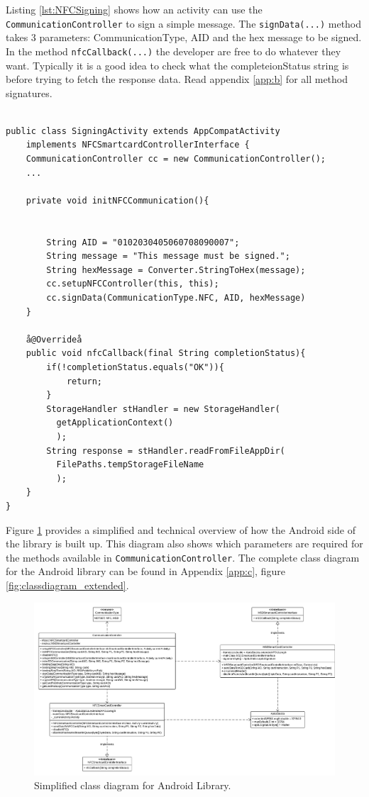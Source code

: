 Listing \ref{lst:NFCSigning} shows how an activity can use the \texttt{CommunicationController} to sign a simple message. The \texttt{signData(...)} method takes 3 parameters: CommunicationType, AID and the hex message to be signed. In the method \texttt{nfcCallback(...)} the developer are free to do whatever they want. Typically it is a good idea to check what the completeionStatus string is before trying to fetch the response data. Read appendix \ref{app:b} for all method signatures.

\begin{lstlisting}[caption=Java code example showing how to send sign a message using a NFC smart card., label=lst:NFCSigning,escapechar=å]

public class SigningActivity extends AppCompatActivity
    implements NFCSmartcardControllerInterface {
    CommunicationController cc = new CommunicationController();
    ...

    private void initNFCCommunication(){


        String AID = "0102030405060708090007";
        String message = "This message must be signed.";
        String hexMessage = Converter.StringToHex(message);
        cc.setupNFCController(this, this);
        cc.signData(CommunicationType.NFC, AID, hexMessage)
    }

    å@Overrideå
    public void nfcCallback(final String completionStatus){
        if(!completionStatus.equals("OK")){
            return;
        }
        StorageHandler stHandler = new StorageHandler(
          getApplicationContext()
          );
        String response = stHandler.readFromFileAppDir(
          FilePaths.tempStorageFileName
          );
    }
}

\end{lstlisting}


Figure \ref{fig:classdiagram_simple} provides a simplified and technical overview of how the Android side of the library is built up. This diagram also shows which parameters are required for the methods available in \texttt{CommunicationController}. The complete class diagram for the Android library can be found in Appendix \ref{app:c}, figure \ref{fig:classdiagram_extended}. %

\begin{figure}[h!]
  \caption{Simplified class diagram for Android Library.}
  \label{fig:classdiagram_simple}
  \centering
    \includegraphics[width=1.25\textwidth, angle =90]{images/Class_Diagram.png}
\end{figure}
\clearpage

